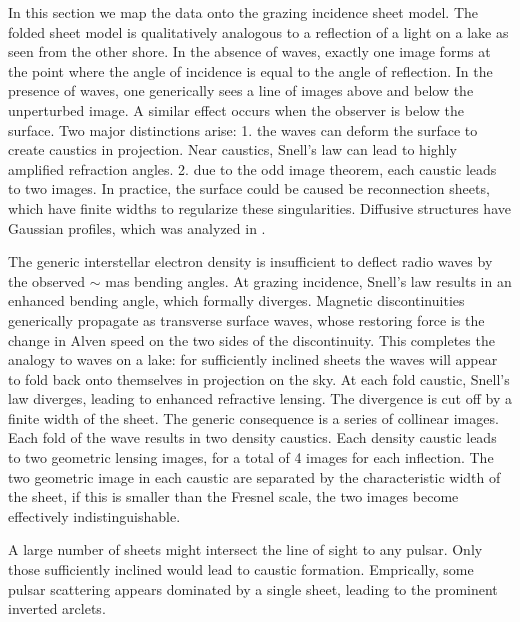 \documentclass[useAMS,usenatbib]{mn2e}
\begin{document}
In this section we map the data onto the grazing incidence sheet
model.  The folded sheet model is qualitatively analogous to a
reflection of a light on a lake as seen from the other shore.  In the
absence of waves, exactly one image forms at the point where the angle
of incidence is equal to the angle of reflection.  In the presence of
waves, one generically sees a line of images above and below the
unperturbed image.  A similar effect occurs when the observer is below
the surface.  Two major distinctions arise: 1. the waves can deform
the surface to create caustics in projection. Near caustics, Snell's
law can lead to highly amplified refraction angles. 2. due to the odd
image theorem, each caustic leads to two images.  In practice, the
surface could be caused be reconnection
sheets\citep{2015MNRAS.450.3201B}, which have finite widths to
regularize these singularities. Diffusive structures have Gaussian
profiles, which was analyzed in \citet{2012MNRAS.421L.132P}.

The generic interstellar electron density is insufficient to deflect
radio waves by the observed $\sim$ mas bending angles. At grazing
incidence, Snell's law results in an enhanced bending angle, which
formally diverges.  Magnetic discontinuities generically propagate
as transverse surface waves, whose restoring force is the change in Alven
speed on the two sides of the discontinuity. This completes the
analogy to waves on a lake: for sufficiently inclined sheets the waves
will appear to fold back onto themselves in projection on the sky.  At
each fold caustic, Snell's law diverges, leading to enhanced
refractive lensing.  The divergence is cut off by a finite width of
the sheet.  The generic consequence is a series of collinear images.
Each fold of the wave results in two density caustics.  Each density
caustic leads to two geometric lensing images, for a total of 4 images
for each inflection.  The two geometric image in each caustic are
separated by the characteristic width of the sheet, if this is smaller
than the Fresnel scale, the two images become effectively
indistinguishable. 

A large number of sheets might intersect the line of sight to any
pulsar. Only those sufficiently inclined would lead to caustic
formation. Emprically, some pulsar scattering appears dominated by a
single sheet, leading to the prominent inverted
arclets\citep{2001ApJ...549L..97S}.
\end{document}
